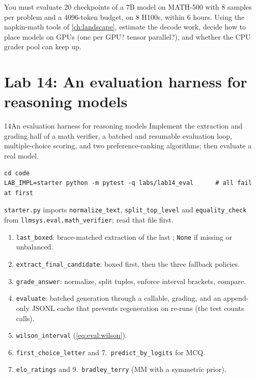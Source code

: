 \begin{exercise}
You must evaluate 20 checkpoints of a 7B model on MATH-500 with 8 samples per problem and a
4096-token budget, on 8 H100s, within 6 hours. Using the napkin-math tools of \cref{ch:landscape},
estimate the decode work, decide how to place models on GPUs (one per GPU? tensor parallel?), and
whether the CPU grader pool can keep up.
\end{exercise}

\section{Lab 14: An evaluation harness for reasoning models}\label{sec:eval:lab}

\begin{labbox}{14}{An evaluation harness for reasoning models}
Implement the extraction and grading half of a math verifier, a batched and resumable evaluation
loop, multiple-choice scoring, and two preference-ranking algorithms; then evaluate a real model.

\begin{lstlisting}[style=shell]
cd code
LAB_IMPL=starter python -m pytest -q labs/lab14_eval      # all fail at first
\end{lstlisting}
\texttt{starter.py} imports \texttt{normalize\_text}, \texttt{split\_top\_level} and
\texttt{equality\_check} from \texttt{llmsys.eval.math\_verifier}; read that file first.

\begin{enumerate}
  \item \texttt{last\_boxed}: brace-matched extraction of the last \bx{}; \texttt{None} if missing
  or unbalanced.
  \item \texttt{extract\_final\_candidate}: boxed first, then the three fallback policies.
  \item \texttt{grade\_answer}: normalize, split tuples, enforce interval brackets, compare.
  \item \texttt{evaluate}: batched generation through a callable, grading, and an append-only JSONL
  cache that prevents regeneration on re-runs (the test counts calls).
  \item \texttt{wilson\_interval} (\cref{eq:eval:wilson}).
  \item \texttt{first\_choice\_letter} and 7.\ \texttt{predict\_by\_logits} for MCQ.
  \setcounter{enumi}{7}
  \item \texttt{elo\_ratings} and 9.\ \texttt{bradley\_terry} (MM with a symmetric prior).
\end{enumerate}


\end{labbox}
